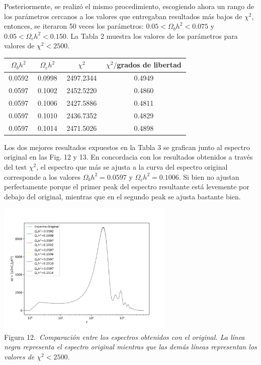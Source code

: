 \documentclass[twocolumn,letterpaper,spanish]{revtex4}
\numberwithin{equation}{section}
\begin{document}
Posteriormente, se realiz\'o el mismo procedimiento, escogiendo ahora un rango de los par\'ametros cercanos a los valores que entregaban resultados m\'as bajos de $\chi^2$, entonces, se iteraron 50 veces los par\'ametros: $0.05<\Omega_b h^2< 0.075$ y $0.05<\Omega_c h^2<0.150$. La Tabla 2 muestra los valores de los par\'ametros para valores de $\chi^2<2500$.

\begin{center}
\begin{tabular}{| c | c | c | c |}\hline
$\Omega_b h^2$ & $\Omega_c h^2$ & $\chi^2$ & \,$\chi^2/$grados de libertad\,       \\ \hline
	\,0.0592\,   & \,0.0998\, & \,2497.2344\,   & 0.4949  \\
	0.0597   & 0.1002 & 2452.5220  & 0.4860  \\
	0.0597   & 0.1006 & 2427.5886  & 0.4811  \\
	0.0597   & 0.1010 & 2436.7352  & 0.4829  \\
	0.0597   & 0.1014 & 2471.5026  & 0.4898   \\\hline
\end{tabular}\label{tabla3}
\end{center}

Los dos mejores resultados expuestos en la Tabla 3 se grafican junto al espectro original en las Fig. 12 y 13. En concordacia con los resultados obtenidos a trav\'es del test $\chi^2$, el espectro que m\'as se ajusta a la curva del espectro original corresponde a los valores $\Omega_b h^2=0.0597$ y $\Omega_c h^2=0.1006$. Si bien no ajustan perfectamente porque el primer peak del espectro resultante est\'a levemente por debajo del original, mientras que en el segundo peak se ajusta bastante bien.

\begin{center}
   \includegraphics[width=85mm]{comparacion.png}\\
   Figura 12.\emph{\ Comparaci\'on entre los espectros obtenidos con el original. La l\'inea negra representa el espectro original mientras que las dem\'as l\'ineas representan los valores de $\chi^2<2500$.}%
\end{center}
\end{document}
